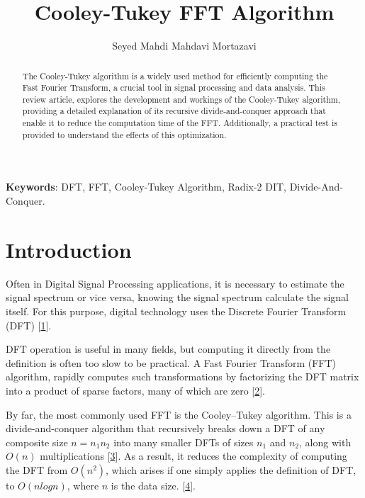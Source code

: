 \documentclass[12pt,a4paper]{article}
\title{\textbf{Cooley-Tukey FFT Algorithm}}
\author[1]{Seyed Mahdi Mahdavi Mortazavi}
\affil[1]{\small \textit{Department of Electrical and Computer Engineering, Shiraz University}}
\date{}  %
\begin{document}
\maketitle

\begin{abstract}
The Cooley-Tukey algorithm is a widely used method for efficiently computing the Fast Fourier Transform, a crucial tool in signal processing and data analysis. This review article, explores the development and workings of the Cooley-Tukey algorithm, providing a detailed explanation of its recursive divide-and-conquer approach that enable it to reduce the computation time of the FFT. Additionally, a practical test is provided to understand the effects of this optimization.
\end{abstract}

\textbf{Keywords}: DFT, FFT, Cooley-Tukey Algorithm, Radix-2 DIT, Divide-And-Conquer.  

\section{Introduction}
\hspace{0.5cm} Often in Digital Signal Processing applications, it is necessary to estimate the signal spectrum or vice versa, knowing the signal spectrum calculate the signal itself. For this purpose, digital technology uses the Discrete Fourier Transform (DFT) [\href{https://www.dsp-weimich.com/digital-signal-processing/fast-fourier-transform-fft-and-their-c-realizations-using-the-octave-gnu-tool/}{1}].

DFT operation is useful in many fields, but computing it directly from the definition is often too slow to be practical. A Fast Fourier Transform (FFT) algorithm, rapidly computes such transformations by factorizing the DFT matrix into a product of sparse factors, many of which are zero [\href{https://en.wikipedia.org/wiki/Fast_Fourier_transform#cite_note-Loan_1992-2}{2}].

By far, the most commonly used FFT is the Cooley–Tukey algorithm. This is a divide-and-conquer algorithm that recursively breaks down a DFT of any composite size $n=n_{1}n_{2}$ into many smaller DFTs of sizes $n_{1}$ and $n_{2}$, along with $O(n)$ multiplications [\href{https://en.wikipedia.org/wiki/Fast_Fourier_transform#cite_note-Gentleman_Sande_1966-18}{3}]. As a result, it reduces the complexity of computing the DFT from $O(n^2)$, which arises if one simply applies the definition of DFT, to $O(nlogn)$, where $n$ is the data size. [\href{https://en.wikipedia.org/wiki/Fast_Fourier_transform}{4}].
\end{document}
